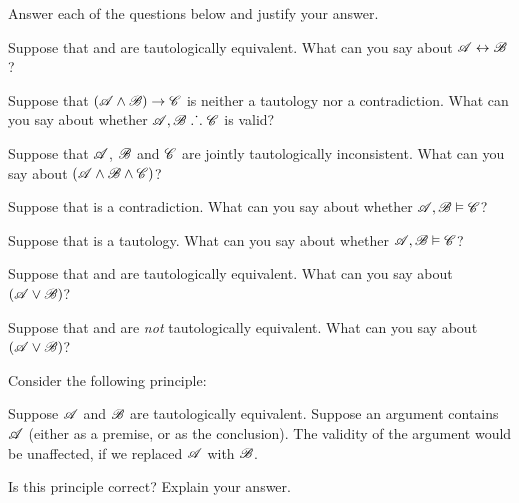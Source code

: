 \problempart
Answer each of the questions below and justify your answer.
\begin{earg}
\item Suppose that  and  are tautologically equivalent. What can you say about $\mathscr{A}\leftrightarrow\mathscr{B}$?
\item Suppose that $(\mathscr{A}\wedge\mathscr{B})\rightarrow\mathscr{C}$ is neither a tautology nor a contradiction. What can you say about whether $\mathscr{A}, \mathscr{B} \mathrel{\ldotp\dot{}\,\ldotp}\mathscr{C}$ is valid?
\item Suppose that $\mathscr{A}$, $\mathscr{B}$ and $\mathscr{C}$  are jointly tautologically inconsistent. What can you say about $(\mathscr{A}\wedge\mathscr{B}\wedge\mathscr{C})$?
\item Suppose that  is a contradiction. What can you say about whether $\mathscr{A}, \mathscr{B} \vDash \mathscr{C}$?
\item Suppose that  is a tautology. What can you say about whether $\mathscr{A}, \mathscr{B}\vDash \mathscr{C}$?
\item Suppose that  and  are tautologically equivalent. What can you say about $(\mathscr{A}\vee\mathscr{B})$?
\item Suppose that  and  are \emph{not} tautologically equivalent. What can you say about $(\mathscr{A}\vee\mathscr{B})$?
\end{earg}
\problempart 
Consider the following principle:
	\begin{ebullet}
		\item Suppose $\mathscr{A}$ and $\mathscr{B}$ are tautologically equivalent. Suppose an argument contains $\mathscr{A}$ (either as a premise, or as the conclusion). The validity of the argument would be unaffected, if we replaced $\mathscr{A}$ with $\mathscr{B}$.
	\end{ebullet}
Is this principle correct? Explain your answer.



